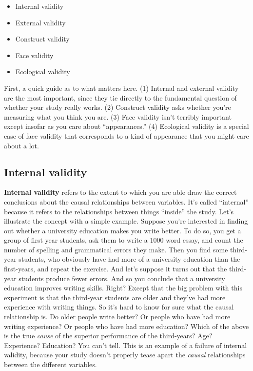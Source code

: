 \documentclass[
]{book}
\providecommand{\tightlist}{%
  \setlength{\itemsep}{0pt}\setlength{\parskip}{0pt}}
\begin{document}
\begin{itemize}
\tightlist
\item
  Internal validity
\item
  External validity
\item
  Construct validity
\item
  Face validity
\item
  Ecological validity
\end{itemize}

First, a quick guide as to what matters here. (1) Internal and external validity are the most important, since they tie directly to the fundamental question of whether your study really works. (2) Construct validity asks whether you're measuring what you think you are. (3) Face validity isn't terribly important except insofar as you care about ``appearances.'' (4) Ecological validity is a special case of face validity that corresponds to a kind of appearance that you might care about a lot.

\hypertarget{internal-validity}{%
\subsection{Internal validity}\label{internal-validity}}

{\textbf{Internal validity}} refers to the extent to which you are able draw the correct conclusions about the causal relationships between variables. It's called ``internal'' because it refers to the relationships between things ``inside'' the study. Let's illustrate the concept with a simple example. Suppose you're interested in finding out whether a university education makes you write better. To do so, you get a group of first year students, ask them to write a 1000 word essay, and count the number of spelling and grammatical errors they make. Then you find some third-year students, who obviously have had more of a university education than the first-years, and repeat the exercise. And let's suppose it turns out that the third-year students produce fewer errors. And so you conclude that a university education improves writing skills. Right? Except that the big problem with this experiment is that the third-year students are older and they've had more experience with writing things. So it's hard to know for sure what the causal relationship is. Do older people write better? Or people who have had more writing experience? Or people who have had more education? Which of the above is the true \emph{cause} of the superior performance of the third-years? Age? Experience? Education? You can't tell. This is an example of a failure of internal validity, because your study doesn't properly tease apart the \emph{causal} relationships between the different variables.
\end{document}
